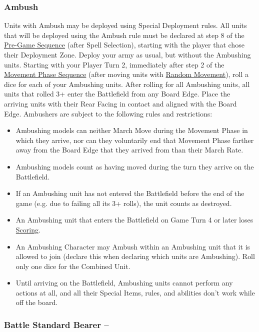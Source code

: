 \subsubsection{Ambush}
\idx[main=y]{\ambush}\label{ambush}

Units with Ambush may be deployed using Special Deployment rules. All units that will be deployed using the Ambush rule must be declared at step 8 of the \hyperref[the_pre_game_sequence]{Pre-Game Sequence} (after Spell Selection), starting with the player that chose their Deployment Zone. Deploy your army as usual, but without the Ambushing units. Starting with your Player Turn 2, immediately after step 2 of the \hyperref[the_movement_phase_sequence]{Movement Phase Sequence} (after moving units with \hyperref[random_movement]{Random Movement}), roll a dice for each of your Ambushing units. After rolling for all Ambushing units, all units that rolled 3+ enter the Battlefield from any Board Edge. Place the arriving units with their Rear Facing in contact and aligned with the Board Edge. Ambushers are subject to the following rules and restrictions:

\begin{itemize}
\item Ambushing models can neither March Move during the Movement Phase in which they arrive, nor can they voluntarily end that Movement Phase farther away from the Board Edge that they arrived from than their March Rate.
\item Ambushing models count as having moved during the turn they arrive on the Battlefield.
\item If an Ambushing unit has not entered the Battlefield before the end of the game (e.g. due to failing all its 3+ rolls), the unit counts as destroyed.
\item An Ambushing unit that enters the Battlefield on Game Turn 4 or later loses \hyperref[scoring]{Scoring}.
\item An Ambushing Character may Ambush within an Ambushing unit that it is allowed to join (declare this when declaring which units are Ambushing). Roll only one dice for the Combined Unit.
\item Until arriving on the Battlefield, Ambushing units cannot perform any actions at all, and all their Special Items, rules, and abilities don't work while off the board.
\end{itemize}

\subsubsection{Battle Standard Bearer -- \oneofakind{}}
\label{bsb}

